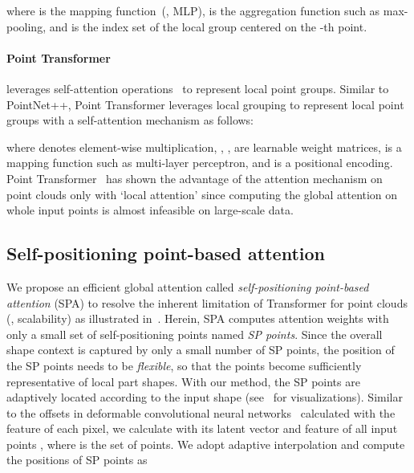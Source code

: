 \documentclass[10pt,twocolumn,letterpaper]{article}
\begin{document}
where  is the mapping function~(\eg, MLP),  is the aggregation function such as max-pooling, and  is the index set of the local group centered on the -th point.


\paragraph{Point Transformer~\cite{zhao2021point}} leverages self-attention operations~\cite{zhao2020exploring} to represent local point groups.
Similar to PointNet++, Point Transformer leverages local grouping to represent local point groups with a self-attention mechanism as follows:

where  denotes element-wise multiplication,  , ,  are learnable weight matrices,  is a mapping function such as multi-layer perceptron, and  is a positional encoding.
Point Transformer~\cite{zhao2021point} has shown the advantage of the attention mechanism on point clouds only with `local attention' since computing the global attention on whole input points is almost infeasible on large-scale data.














     \subsection{Self-positioning point-based attention}
    \label{sec:3.2}



We propose an efficient global attention called \textit{self-positioning point-based attention} (SPA) to resolve the inherent limitation of Transformer for point clouds (\eg, scalability) as illustrated in~.
Herein, SPA computes attention weights with only a small set of self-positioning points named \textit{SP points}.
Since the overall shape context is captured by only a small number of SP points, the position of the SP points  needs to be \textit{flexible}, so that the points become sufficiently representative of local part shapes.
With our method, the SP points are adaptively located according to the input shape (see~ for visualizations).
Similar to the offsets in deformable convolutional neural networks~\cite{dai2017deformable} calculated with the feature of each pixel, we calculate  with its latent vector  and feature  of all input points , where  is the set of points.
We adopt adaptive interpolation and compute the positions of SP points as
\end{document}
